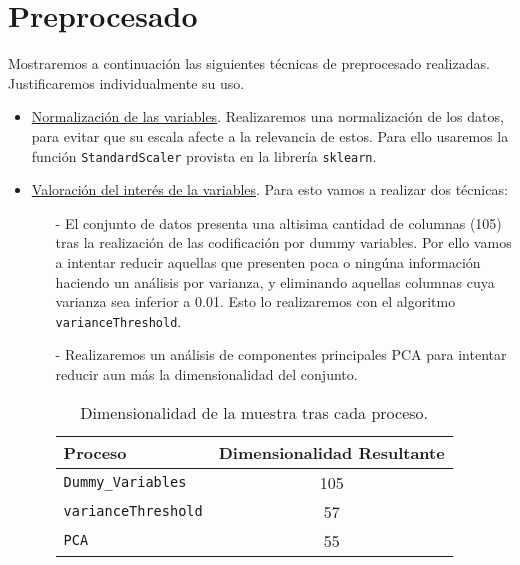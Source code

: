 \documentclass[11pt,a4paper]{article}
\begin{document}
\section{Preprocesado}

Mostraremos a continuación las siguientes técnicas de preprocesado realizadas. Justificaremos individualmente su uso.

\begin{itemize}

	\item \underline{Normalización de las variables}. Realizaremos una normalización de los datos, para evitar que su escala afecte a la relevancia de estos. Para ello usaremos la función \texttt{StandardScaler}\cite{standardscaler} provista en la librería \texttt{sklearn}.
		\item \underline{Valoración del interés de la variables}. Para esto vamos a realizar dos técnicas:
	
	\begin{itemize}
	\item[-] El conjunto de datos presenta una altisima cantidad de columnas (105) tras la realización de las codificación por dummy variables. Por ello vamos a intentar reducir aquellas que presenten poca o ningúna información haciendo un análisis por varianza, y eliminando aquellas columnas cuya varianza sea inferior a 0.01. Esto lo realizaremos con el algoritmo \texttt{varianceThreshold}\cite{einstein}.
	
	\item[-] Realizaremos un análisis de componentes principales PCA\cite{PCA} para intentar reducir aun más la dimensionalidad del conjunto. 


		
\begin{table}[h]
\begin{center}
\begin{tabular}{|l|c|}
\hline
 Proceso & Dimensionalidad Resultante \\ \hline
 \texttt{Dummy\_Variables} &  105\\
\texttt{varianceThreshold} &57 \\
\texttt{PCA} & 55 \\\hline
\end{tabular}
\end{center}
\caption{Dimensionalidad de la muestra tras cada proceso.}
	\end{table}

\end{itemize}


\end{itemize}
\end{document}
